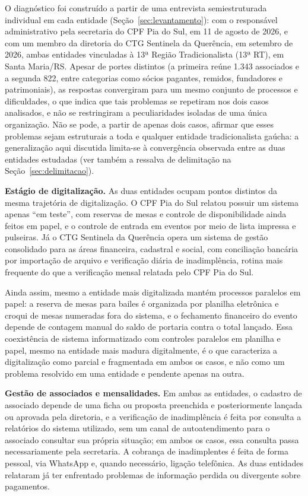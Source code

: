 \documentclass[12pt,a4paper]{article}
\begin{document}
O diagnóstico foi construído a partir de uma entrevista semiestruturada individual em cada entidade
(Seção~\ref{sec:levantamento}): com o responsável administrativo pela secretaria do CPF Pia do Sul, em 11 de
agosto de 2026, e com um membro da diretoria do CTG Sentinela da Querência, em setembro de 2026, ambas
entidades vinculadas à 13ª Região Tradicionalista (13ª RT), em Santa Maria/RS. Apesar de portes distintos (a primeira reúne 1.343
associados e a segunda 822, entre
categorias como sócios pagantes, remidos, fundadores e patrimoniais), as respostas convergiram para
um mesmo conjunto de processos e dificuldades, o que indica que tais problemas se repetiram nos dois
casos analisados, e não se restringiram a peculiaridades isoladas de uma única organização. Não se
pode, a partir de apenas dois casos, afirmar que esses problemas sejam estruturais a toda e qualquer
entidade tradicionalista gaúcha: a generalização aqui discutida limita-se à convergência observada
entre as duas entidades estudadas (ver também a ressalva de delimitação na
Seção~\ref{sec:delimitacao}).

\textbf{Estágio de digitalização.} As duas entidades ocupam pontos distintos da mesma trajetória de
digitalização. O CPF Pia do Sul relatou possuir um sistema apenas ``em teste'', com reservas de mesas
e controle de disponibilidade ainda feitos em papel, e o controle de entrada em eventos por meio de
lista impressa e pulseiras. Já o CTG Sentinela da Querência opera um sistema de gestão consolidado
para as áreas financeira, cadastral e social, com conciliação bancária por importação de arquivo e
verificação diária de inadimplência, rotina mais frequente do que a verificação mensal relatada pelo
CPF Pia do Sul.

Ainda assim, mesmo a entidade mais digitalizada mantém processos paralelos em papel:
a reserva de mesas para bailes é organizada por planilha eletrônica e croqui de mesas numeradas fora
do sistema, e o fechamento financeiro do evento depende de contagem manual do saldo de portaria contra
o total lançado. Essa coexistência de sistema informatizado com controles paralelos em planilha e
papel, mesmo na entidade mais madura digitalmente, é o que caracteriza a digitalização como parcial e
fragmentada em ambos os casos, e não como um problema resolvido em uma entidade e pendente apenas na
outra.

\textbf{Gestão de associados e mensalidades.} Em ambas as entidades, o cadastro de associado depende
de uma ficha ou proposta preenchida e posteriormente lançada ou aprovada pela diretoria, e a
verificação de inadimplência é feita por consulta a relatórios do sistema utilizado, sem um canal de
autoatendimento para o associado consultar sua própria situação; em ambos os casos, essa consulta
passa necessariamente pela secretaria. A cobrança de inadimplentes é feita de forma pessoal, via
WhatsApp e, quando necessário, ligação telefônica. As duas entidades relataram já ter enfrentado
problemas de informação perdida ou divergente sobre pagamentos.
\end{document}
